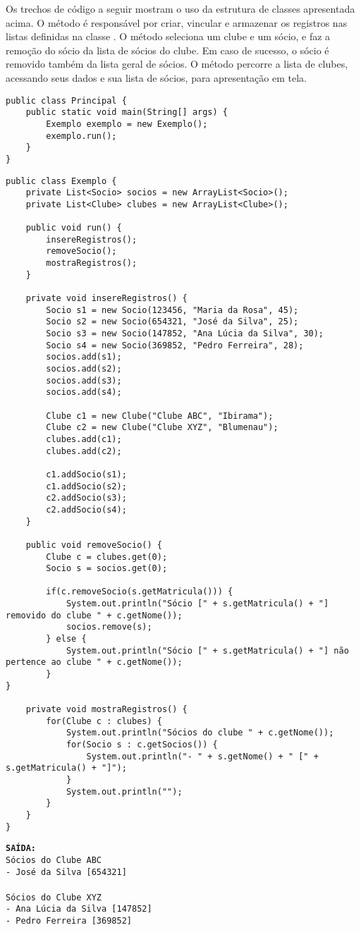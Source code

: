 Os trechos de código a seguir mostram o uso da estrutura de classes apresentada acima. O método  é responsável por criar, vincular e armazenar os registros nas listas definidas na classe . O método  seleciona um clube e um sócio, e faz a remoção do sócio da lista de sócios do clube. Em caso de sucesso, o sócio é removido também da lista geral de sócios. O método  percorre a lista de clubes, acessando seus dados e sua lista de sócios, para apresentação em tela.

\begin{verbatim}
public class Principal {
	public static void main(String[] args) {
		Exemplo exemplo = new Exemplo();
		exemplo.run();
	}
}	
\end{verbatim}

\begin{verbatim}
public class Exemplo {
	private List<Socio> socios = new ArrayList<Socio>();
	private List<Clube> clubes = new ArrayList<Clube>();

	public void run() {
		insereRegistros();
		removeSocio();
		mostraRegistros();
	}

	private void insereRegistros() {
		Socio s1 = new Socio(123456, "Maria da Rosa", 45);
		Socio s2 = new Socio(654321, "José da Silva", 25);
		Socio s3 = new Socio(147852, "Ana Lúcia da Silva", 30);
		Socio s4 = new Socio(369852, "Pedro Ferreira", 28);
		socios.add(s1);
		socios.add(s2);
		socios.add(s3);
		socios.add(s4);

		Clube c1 = new Clube("Clube ABC", "Ibirama");
		Clube c2 = new Clube("Clube XYZ", "Blumenau");
		clubes.add(c1);
		clubes.add(c2);

		c1.addSocio(s1);
		c1.addSocio(s2);
		c2.addSocio(s3);
		c2.addSocio(s4);
	}

	public void removeSocio() {
		Clube c = clubes.get(0);
		Socio s = socios.get(0);

		if(c.removeSocio(s.getMatricula())) {
			System.out.println("Sócio [" + s.getMatricula() + "] removido do clube " + c.getNome());
			socios.remove(s);
		} else {
			System.out.println("Sócio [" + s.getMatricula() + "] não pertence ao clube " + c.getNome());
		}
}

	private void mostraRegistros() {
		for(Clube c : clubes) {
			System.out.println("Sócios do clube " + c.getNome());
			for(Socio s : c.getSocios()) {
				System.out.println("- " + s.getNome() + " [" + s.getMatricula() + "]");
			}
			System.out.println("");
		}
	}
}
\end{verbatim}

\begin{minipage}{\textwidth}
	\textbf{\texttt{SAÍDA:}}\\
	\texttt{Sócios do Clube ABC}\\
	\texttt{- José da Silva [654321]}\\
	\\
	\texttt{Sócios do Clube XYZ}\\
	\texttt{- Ana Lúcia da Silva [147852]}\\
	\texttt{- Pedro Ferreira [369852]}
\end{minipage}